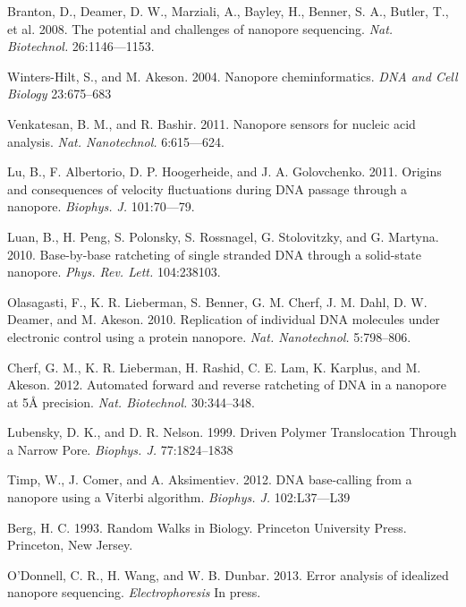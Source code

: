 \documentclass{biophys_letter}
\begin{document}
\begin{thebibliography}{99}

  Branton, D., Deamer, D. W., Marziali, A., Bayley, H., Benner, S. A., Butler, T., et al.
  2008.
  The potential and challenges of nanopore sequencing.
  {\it Nat. Biotechnol.}
  26:1146---1153.

  Winters-Hilt, S., and M. Akeson.
  2004.
  Nanopore cheminformatics.
  {\it DNA and Cell Biology}
  23:675--683

  Venkatesan, B. M., and R. Bashir.
  2011.
  Nanopore sensors for nucleic acid analysis.
  {\it Nat. Nanotechnol.}
  6:615---624.

  Lu, B., F. Albertorio, D. P. Hoogerheide, and J. A. Golovchenko.
  2011.
  Origins and consequences of velocity fluctuations during DNA passage through a nanopore.
  {\it Biophys. J.}
  101:70---79.

  Luan, B., H. Peng, S. Polonsky, S. Rossnagel, G. Stolovitzky, and G. Martyna.
  2010.
  Base-by-base ratcheting of single stranded DNA through a solid-state nanopore.
  {\it Phys. Rev. Lett.}
  104:238103.

  Olasagasti, F., K. R. Lieberman, S. Benner, G. M. Cherf, J. M. Dahl, D. W. Deamer, and M. Akeson.
  2010.
  Replication of individual DNA molecules under electronic control using a protein nanopore.
  {\it Nat. Nanotechnol.}
  5:798--806.

  Cherf, G. M., K. R. Lieberman, H. Rashid, C. E. Lam, K. Karplus, and M. Akeson.
  2012.
  Automated forward and reverse ratcheting of DNA in a nanopore at 5{\AA} precision.
  {\it Nat. Biotechnol.}
  30:344--348.

  Lubensky, D. K., and D. R. Nelson.
  1999.
  Driven Polymer Translocation Through a Narrow Pore.
  {\it Biophys. J.}
  77:1824--1838

  Timp, W., J. Comer, and A. Aksimentiev. 
  2012.
  DNA base-calling from a nanopore using a Viterbi algorithm.
  {\it Biophys. J.}
  102:L37---L39

  Berg, H. C.
  1993.
  Random Walks in Biology.
  Princeton University Press.
  Princeton, New Jersey.

  O'Donnell, C. R., H. Wang, and W. B. Dunbar.
  2013.
  Error analysis of idealized nanopore sequencing.
  {\it Electrophoresis}
  In press.


\end{thebibliography}
\end{document}
